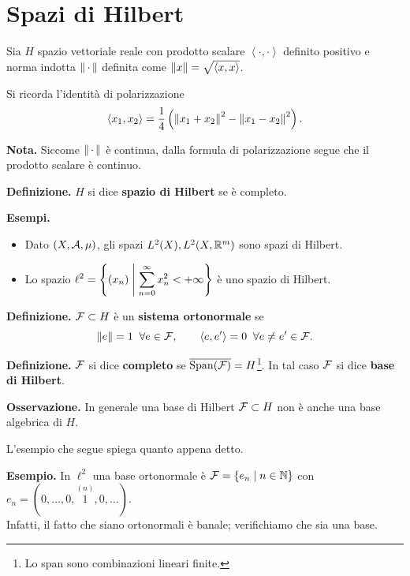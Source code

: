 %
%

\chapter{Spazi di Hilbert}

Sia $H$ spazio vettoriale reale con prodotto scalare $\left<\cdot, \cdot \right>$ definito positivo e norma indotta $\left\lVert \,\cdot\, \right\rVert$ definita come $\left\lVert x \right\rVert = \sqrt{\left<x,x \right>}$.

Si ricorda l'identità di polarizzazione
%
$$
	\left<x_1,x_2 \right> = \frac{1}{4} \left( \left\lVert x_1 + x_2 \right\rVert^2 - \left\lVert x_1 - x_2 \right\rVert^2 \right).
$$
%

\textbf{Nota.} Siccome $\left\lVert \,\cdot\, \right\rVert$ è continua, dalla formula di polarizzazione segue che il prodotto scalare è continuo.

\textbf{Definizione.} $H$ si dice \textbf{spazio di Hilbert} se è completo.

\textbf{Esempi.} 
\begin{itemize}

	\item Dato $(X, \mathcal{A}, \mu )$, gli spazi $L^2(X), L^2(X, \mathbb R^m)$ sono spazi di Hilbert.

	\item Lo spazio $\displaystyle \ell^2 = \left\{ (x_n) \;\middle|\; \sum_{n=0}^{\infty} x_n^2 < +\infty  \right\}$ è uno spazio di Hilbert.

\end{itemize}

\textbf{Definizione.} $\mathcal{F} \subset H$ è un \textbf{sistema ortonormale} se
%
$$
	\left\lVert e \right\rVert = 1 \;\; \forall e \in \mathcal{F}, \qquad  \left<e,e' \right> = 0 \;\; \forall e \neq e' \in \mathcal{F}.
$$
%


\textbf{Definizione.} $\mathcal{F}$ si dice \textbf{completo} se $\overline{\operatorname{Span}(\mathcal{F})} = H$\footnote{Lo span sono combinazioni lineari finite.}. In tal caso $\mathcal{F}$ si dice \textbf{base di Hilbert}.

\vs

\textbf{Osservazione.} In generale una base di Hilbert $\mathcal{F} \subset H$ non è anche una base algebrica di $H$.

L'esempio che segue spiega quanto appena detto.

\textbf{Esempio.} In $\ell^2$ una base ortonormale è $\mathcal{F} = \left\{ e_n \;\middle|\; n \in \mathbb N \right\}$ con $e_n = (0,\ldots ,0,\overset{(n)}{1},0,\ldots )$. \\
Infatti, il fatto che siano ortonormali è banale; verifichiamo che sia una base. 


